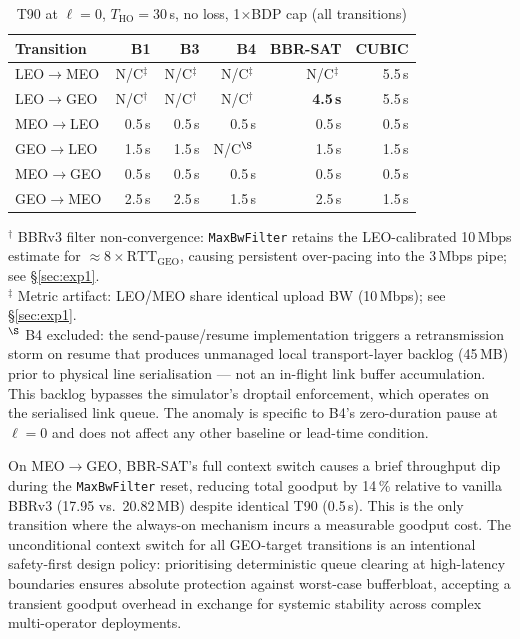 \documentclass[conference]{IEEEtran}
\begin{document}
\begin{table}[t]
\centering
\caption{T90 at $\ell = 0$, $T_\mathrm{HO} = 30$\,s, no loss, 1$\times$BDP cap
         (all transitions)}
\label{tab:exp1_all_transitions}
\small
\setlength{\tabcolsep}{5pt}
\begin{tabular}{lrrrrr}
\toprule
Transition & B1 & B3 & B4 & BBR-SAT & CUBIC \\
\midrule
LEO$\to$MEO  & N/C$^\ddagger$\, & N/C$^\ddagger$\, & N/C$^\ddagger$\, & N/C$^\ddagger$\, & 5.5\,s \\
LEO$\to$GEO  & N/C$^\dagger$\, & N/C$^\dagger$\, & N/C$^\dagger$\, & \textbf{4.5\,s} & 5.5\,s \\
MEO$\to$LEO  & 0.5\,s & 0.5\,s & 0.5\,s & 0.5\,s  & 0.5\,s \\
GEO$\to$LEO  & 1.5\,s & 1.5\,s & N/C$^\S$\, & 1.5\,s  & 1.5\,s \\
MEO$\to$GEO  & 0.5\,s & 0.5\,s & 0.5\,s & 0.5\,s  & 0.5\,s \\
GEO$\to$MEO  & 2.5\,s & 2.5\,s & 1.5\,s & 2.5\,s  & 1.5\,s \\
\bottomrule
\end{tabular}
\vspace{2pt}

{\footnotesize $^\dagger$ BBRv3 filter non-convergence: \texttt{MaxBwFilter} retains the LEO-calibrated 10\,Mbps estimate for ${\approx}8{\times}\mathrm{RTT}_\mathrm{GEO}$, causing persistent over-pacing into the 3\,Mbps pipe; see \S\ref{sec:exp1}.\\
$^\ddagger$ Metric artifact: LEO/MEO share identical upload BW (10\,Mbps); see \S\ref{sec:exp1}.\\
$^\S$ B4 excluded: the send-pause/resume implementation triggers a retransmission storm on resume that produces unmanaged local transport-layer backlog (45\,MB) prior to physical line serialisation --- not an in-flight link buffer accumulation. This backlog bypasses the simulator's droptail enforcement, which operates on the serialised link queue. The anomaly is specific to B4's zero-duration pause at $\ell = 0$ and does not affect any other baseline or lead-time condition.}
\end{table}

On MEO$\to$GEO, BBR-SAT's full context switch causes a brief throughput
dip during the \texttt{MaxBwFilter} reset, reducing total goodput by
14\,\% relative to vanilla BBRv3 (17.95 vs.\ 20.82\,MB) despite identical
T90 (0.5\,s).
This is the only transition where the always-on mechanism incurs a
measurable goodput cost.
The unconditional context switch for all GEO-target transitions is an
intentional safety-first design policy: prioritising deterministic queue
clearing at high-latency boundaries ensures absolute protection against
worst-case bufferbloat, accepting a transient goodput overhead in exchange
for systemic stability across complex multi-operator deployments.
\end{document}

